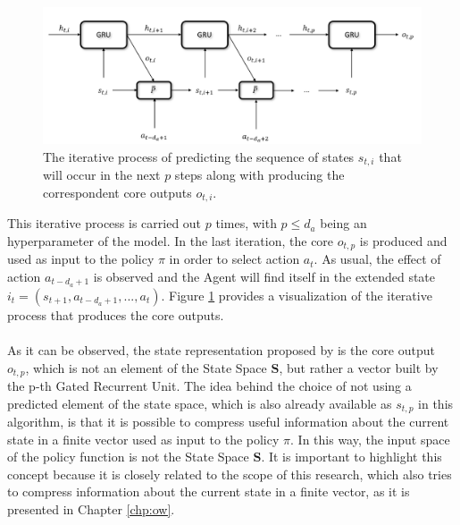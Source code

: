                 \begin{figure}[b]
                    \centering
                    \includegraphics[width=15cm, keepaspectratio]{images/dmdp/modelbased_ssbm.png}
                    \caption{The iterative process of predicting the sequence of states $s_{t, i}$ that will occur in the next $p$ steps along with producing the correspondent core outputs $o_{t, i}$.}
                    \label{fig:modelbased_ssbm}
                \end{figure}
                \noindent
                This iterative process is carried out $p$ times, with $p \leq d_a$ being an hyperparameter of the model. In the last iteration, the core $o_{t, p}$ is produced and used as input to the policy $\pi$ in order to select action $a_t$. As usual, the effect of action $a_{t-d_a+1}$ is observed and the Agent will find itself in the extended state $i_t = \left( s_{t+1}, a_{t-d_a+1},..., a_{t}\right)$. Figure \ref{fig:modelbased_ssbm} provides a visualization of the iterative process that produces the core outputs.
                \\\\
                As it can be observed, the state representation proposed by  is the core output $o_{t,p}$, which is not an element of the State Space $\mathbf{S}$, but rather a vector built by the p-th Gated Recurrent Unit. The idea behind the choice of not using a predicted element of the state space, which is also already available as $s_{t,p}$ in this algorithm, is that it is possible to compress useful information about the current state in a finite vector used as input to the policy $\pi$. In this way, the input space of the policy function is not the State Space $\mathbf{S}$. \newline
                It is important to highlight this concept because it is closely related to the scope of this research, which also tries to compress information about the current state in a finite vector, as it is presented in Chapter \ref{chp:ow}.
                \\\\

